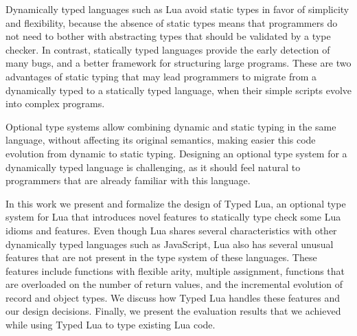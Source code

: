 Dynamically typed languages such as Lua avoid static types in favor of
simplicity and flexibility, because the absence of static types means
that programmers do not need to bother with abstracting types that
should be validated by a type checker.
In contrast, statically typed languages provide the early detection of
many bugs, and a better framework for structuring large programs.
These are two advantages of static typing that may lead programmers
to migrate from a dynamically typed to a statically typed language,
when their simple scripts evolve into complex programs.

Optional type systems allow combining dynamic and static typing in
the same language, without affecting its original semantics,
making easier this code evolution from dynamic to static typing.
Designing an optional type system for a dynamically typed language
is challenging, as it should feel natural to programmers that are
already familiar with this language.

In this work we present and formalize the design of Typed Lua,
an optional type system for Lua that introduces novel features
to statically type check some Lua idioms and features.
Even though Lua shares several characteristics with other dynamically
typed languages such as JavaScript, Lua also has several unusual features
that are not present in the type system of these languages.
These features include functions with flexible arity, multiple assignment,
functions that are overloaded on the number of return values, and the
incremental evolution of record and object types.
We discuss how Typed Lua handles these features and our design decisions.
Finally, we present the evaluation results that we achieved while using
Typed Lua to type existing Lua code.
